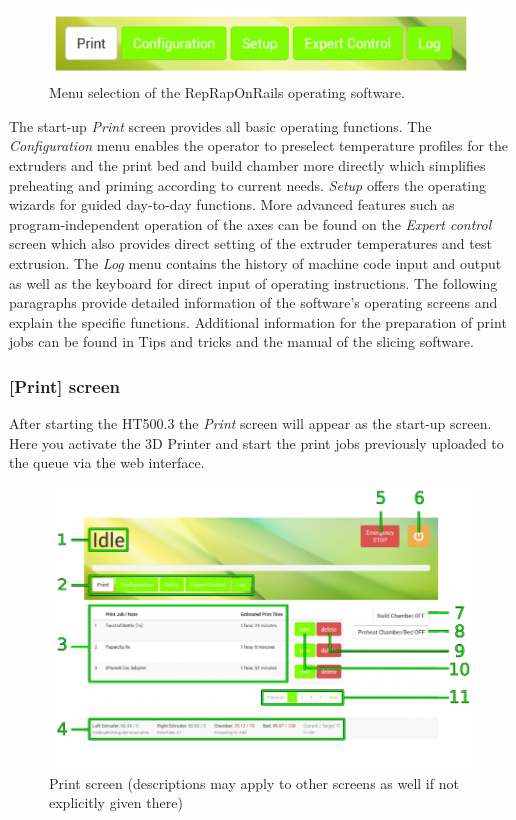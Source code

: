 \begin{figure}[H]
  \centering
  \includegraphics[width=.7\linewidth]{./img/gui_menues_v110.png}
  \caption{Menu selection of the RepRapOnRails operating software.}
\end{figure}

The start-up \emph{Print} screen provides all basic operating functions.
The \emph{Configuration} menu enables the operator to preselect temperature profiles for the extruders and the print bed and build chamber more directly which simplifies preheating and priming according to current needs.
\emph{Setup} offers the operating wizards for guided day-to-day functions.
More advanced features such as program-independent operation of the axes can be found on the \emph{Expert control} screen which also provides direct setting of the extruder temperatures and test extrusion.
The \emph{Log} menu contains the history of machine code input and output as well as the keyboard for direct input of operating instructions.
The following paragraphs provide detailed information of the software's operating screens and explain the specific functions.
Additional information for the preparation of print jobs can be found in Tips and tricks and the manual of the slicing software. 


\subsubsection{[Print] screen}

 After starting the HT500.3 the \emph{Print} screen will appear as the start-up screen. Here you activate the 3D Printer and start the print jobs previously uploaded to the queue via the web interface.

\begin{figure}[H]
  \centering
  \includegraphics[width=.7\linewidth]{./img/gui_printtabnumber_v110.png}
  \caption{Print screen (descriptions may apply to other screens as well if not 
           explicitly given there)}
\end{figure}

